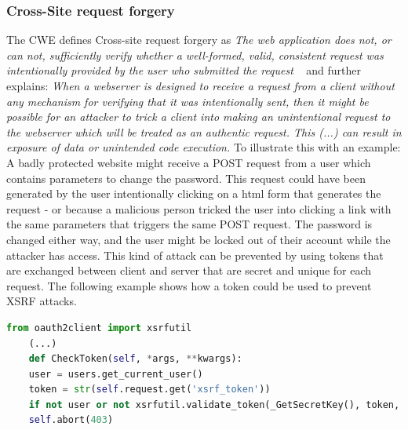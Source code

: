 \documentclass[
a4paper,
pagesize,
pdftex,
12pt,
twoside, %
BCOR=5mm, %
ngerman,
fleqn,
final,
]{scrartcl}
\begin{document}
	\subsubsection{Cross-Site request forgery}
	The CWE defines Cross-site request forgery as \textit{The web application does not, or can not, sufficiently verify whether a well-formed, valid, consistent request was intentionally provided by the user who submitted the request} ~\cite{CommonWeaknessEnumeration.19.9.2019b} and further explains: \textit{When a webserver is designed to receive a request from a client without any mechanism for verifying that it was intentionally sent, then it might be possible for an attacker to trick a client into making an unintentional request to the webserver which will be treated as an authentic request. This (...) can result in exposure of data or unintended code execution.} To illustrate this with an example: A badly protected website might receive a POST request from a user which contains parameters to change the password. This request could have been generated by the user intentionally clicking on a html form that generates the request - or because a malicious person tricked the user into clicking a link with the same parameters that triggers the same POST request. The password is changed either way, and the user might be locked out of their account while the attacker has access. This kind of attack can be prevented by using tokens that are exchanged between client and server that are secret and unique for each request. The following example shows how a token could be used to prevent XSRF attacks.
	\begin{lstlisting}[language=Python, showstringspaces=False]
	from oauth2client import xsrfutil
	(...)
	def CheckToken(self, *args, **kwargs):
	user = users.get_current_user()
	token = str(self.request.get('xsrf_token'))
	if not user or not xsrfutil.validate_token(_GetSecretKey(), token, user.user_id()):
	self.abort(403)
	
	\end{lstlisting}
	
\end{document}
